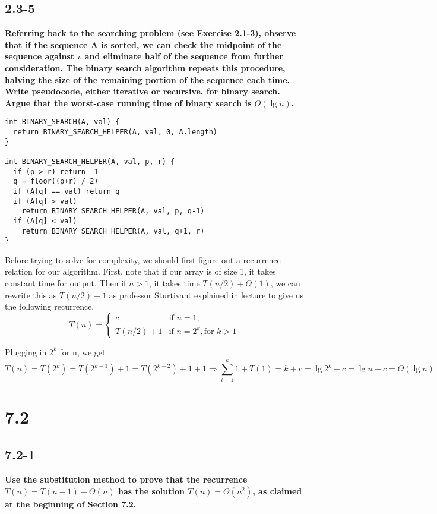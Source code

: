 \documentclass[11pt]{article}
\begin{document}
 \newpage

 \subsection*{2.3-5}
 \textbf{Referring back to the searching problem (see Exercise 2.1-3), observe that if the sequence 
 A is sorted, we can check the midpoint of the sequence against $v$ and eliminate half of the sequence 
 from further consideration. The binary search algorithm repeats this procedure, halving the size of 
 the remaining portion of the sequence each time. Write pseudocode, either iterative or recursive, 
 for binary search. Argue that the worst-case running time of binary search is $\Theta (\lg n)$.}

 \begin{verbatim}
int BINARY_SEARCH(A, val) {
  return BINARY_SEARCH_HELPER(A, val, 0, A.length)
}

int BINARY_SEARCH_HELPER(A, val, p, r) {
  if (p > r) return -1
  q = floor((p+r) / 2)
  if (A[q] == val) return q 
  if (A[q] > val) 
    return BINARY_SEARCH_HELPER(A, val, p, q-1)
  if (A[q] < val) 
    return BINARY_SEARCH_HELPER(A, val, q+1, r)
}\end{verbatim}
Before trying to solve for complexity, we should first figure out a recurrence relation for our algorithm. 
First, note that if our array is of size 1, it takes constant time for output.  Then if $n>1$, it takes 
time $T(n/2) + \Theta (1)$, we can rewrite this as $T(n/2) + 1$ as professor Sturtivant explained in lecture 
to give us the following recurrence.
 \[
   T(n) = 
   \begin{cases}
     c & \text{if } n = 1, \\
     T(n/2) + 1 & \text{if } n = 2^k, \text{for } k > 1
   \end{cases}
 \]

 Plugging in $2^k$ for n, we get 
 $$T(n) = T(2^k) = T(2^{k-1}) + 1 = T(2^{k-2}) + 1 + 1 \Rightarrow
 \displaystyle\sum_{i=1}^{k} 1 + T(1) = k + c = \lg 2^k + c= \lg n + c = \Theta (\lg n)$$
 \section*{7.2}

 \subsection*{7.2-1}
 \textbf{Use the substitution method to prove that the recurrence $T(n) = T(n-1) + \Theta (n)$ has the
 solution $T(n) = \Theta (n^2)$, as claimed at the beginning of Section 7.2.} \\
\end{document}
